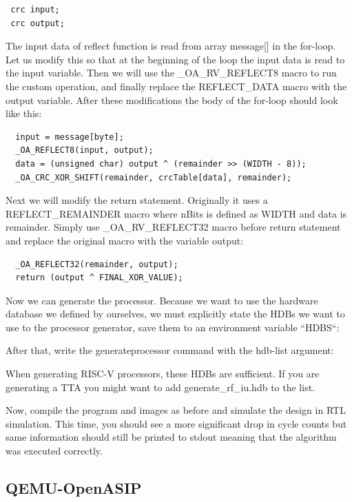 \documentclass[a4paper,twoside]{tceusermanual}
\begin{document}
\begin{verbatim}
 crc input;
 crc output;
\end{verbatim}

The input data of reflect function is read from array message[] in the for-loop.
Let us modify this so that at the beginning of the loop the input data is
read to the input variable. Then we will use the \_OA\_RV\_REFLECT8 macro to run
the custom operation, and finally replace the REFLECT\_DATA macro with the
output variable. After these modifications the body of the for-loop should
look like this:

\begin{verbatim}
  input = message[byte];
  _OA_REFLECT8(input, output);
  data = (unsigned char) output ^ (remainder >> (WIDTH - 8));
  _OA_CRC_XOR_SHIFT(remainder, crcTable[data], remainder);
\end{verbatim}

   
Next we will modify the return statement. Originally it uses a
REFLECT\_REMAINDER macro where nBits is defined as WIDTH and data is
remainder. Simply use \_OA\_RV\_REFLECT32 macro before return statement and
replace the original macro with the variable output:
\begin{verbatim}
  _OA_REFLECT32(remainder, output);
  return (output ^ FINAL_XOR_VALUE);
\end{verbatim}

Now we can generate the processor. Because we want to use the hardware database
we defined by ourselves, we must explicitly state the HDBs we want to use to the
processor generator, save them to an environment variable ``HDBS``:


After that, write the generateprocessor command with the hdb-list argument:


When generating RISC-V processors, these HDBs are sufficient. If you are
generating a TTA you might want to add generate\_rf\_iu.hdb to the list.

Now, compile the program and images as before and simulate the design in RTL
simulation. This time, you should see a more significant drop in cycle counts
but same information should still be printed to stdout meaning that the algorithm
was executed correctly.

\subsection{QEMU-OpenASIP}
\end{document}
